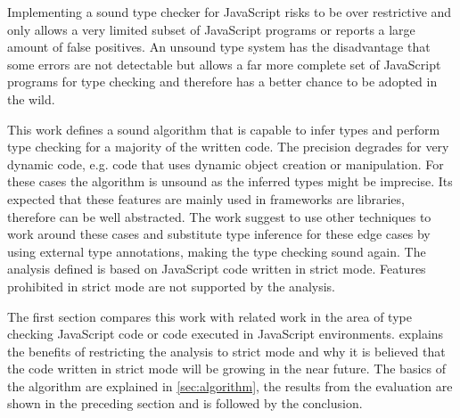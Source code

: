 Implementing a sound type checker for JavaScript risks to be over restrictive and only allows a very limited subset of JavaScript programs or reports a large amount of false positives. An unsound type system has the disadvantage that some errors are not detectable but allows a far more complete set of JavaScript programs for type checking and therefore has a better chance to be adopted in the wild. 

This work defines a sound algorithm that is capable to infer types and perform type checking for a majority of the written code. The precision degrades for very dynamic code, e.g. code that uses dynamic object creation or manipulation. For these cases the algorithm is unsound as the inferred types might be imprecise. Its expected that these features are mainly used in frameworks are libraries, therefore can be well abstracted. The work suggest to use other techniques to work around these cases and substitute type inference for these edge cases by using external type annotations, making the type checking sound again. The analysis defined is based on JavaScript code written in strict mode. Features prohibited in strict mode are not supported by the analysis.


The first section compares this work with related work in the area of type checking JavaScript code or code executed in JavaScript environments.  explains the benefits of restricting the analysis to strict mode and why it is believed that the code written in strict mode will be growing in the near future. The basics of the algorithm are explained in \cref{sec:algorithm}, the results from the evaluation are shown in the preceding section and is followed by the conclusion.
